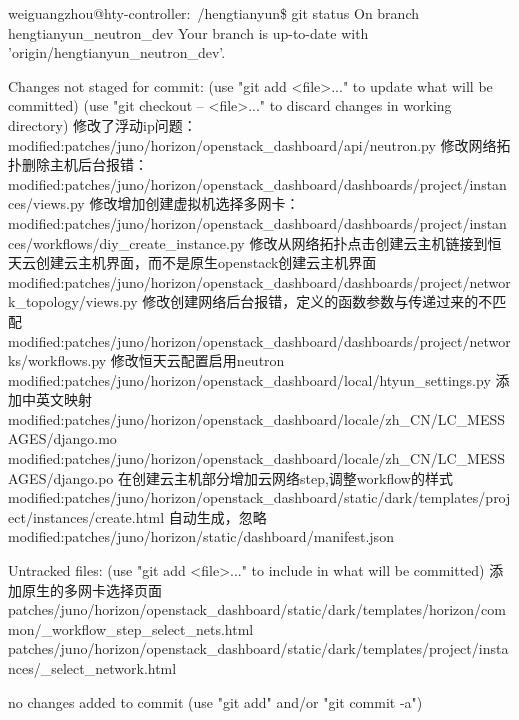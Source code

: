 weiguangzhou@hty-controller:~/hengtianyun\$ git status
On branch hengtianyun_neutron_dev
Your branch is up-to-date with 'origin/hengtianyun_neutron_dev'.

Changes not staged for commit:
  (use "git add <file>..." to update what will be committed)
  (use "git checkout -- <file>..." to discard changes in working directory)
    修改了浮动ip问题：
	modified:patches/juno/horizon/openstack_dashboard/api/neutron.py
    修改网络拓扑删除主机后台报错：
	modified:patches/juno/horizon/openstack_dashboard/dashboards/project/instances/views.py
	修改增加创建虚拟机选择多网卡：
    modified:patches/juno/horizon/openstack_dashboard/dashboards/project/instances/workflows/diy_create_instance.py
	修改从网络拓扑点击创建云主机链接到恒天云创建云主机界面，而不是原生openstack创建云主机界面
    modified:patches/juno/horizon/openstack_dashboard/dashboards/project/network_topology/views.py
    修改创建网络后台报错，定义的函数参数与传递过来的不匹配
	modified:patches/juno/horizon/openstack_dashboard/dashboards/project/networks/workflows.py
    修改恒天云配置启用neutron
	modified:patches/juno/horizon/openstack_dashboard/local/htyun_settings.py
    添加中英文映射
	modified:patches/juno/horizon/openstack_dashboard/locale/zh_CN/LC_MESSAGES/django.mo
	modified:patches/juno/horizon/openstack_dashboard/locale/zh_CN/LC_MESSAGES/django.po
	在创建云主机部分增加云网络step,调整workflow的样式
	modified:patches/juno/horizon/openstack_dashboard/static/dark/templates/project/instances/create.html
	自动生成，忽略
	modified:patches/juno/horizon/static/dashboard/manifest.json

Untracked files:
  (use "git add <file>..." to include in what will be committed)
    添加原生的多网卡选择页面
	patches/juno/horizon/openstack_dashboard/static/dark/templates/horizon/common/_workflow_step_select_nets.html
	patches/juno/horizon/openstack_dashboard/static/dark/templates/project/instances/_select_network.html

no changes added to commit (use "git add" and/or "git commit -a")
